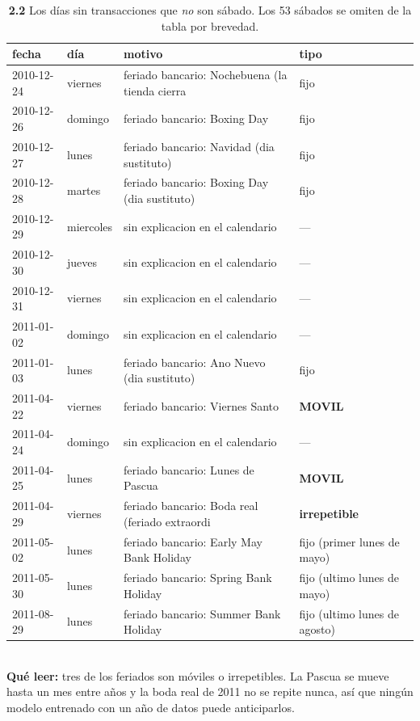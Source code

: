 \begin{table}[htbp]
\centering
\footnotesize
\caption{\textbf{2.2} Los d\'ias sin transacciones que \emph{no} son s\'abado. Los 53 s\'abados se omiten de la tabla por brevedad.}
\label{tab:p2_feriados}
\begin{tabular}{llll}
\toprule
\textbf{fecha} & \textbf{d\'ia} & \textbf{motivo} & \textbf{tipo} \\
\midrule
2010-12-24 & viernes & feriado bancario: Nochebuena (la tienda cierra & fijo \\
2010-12-26 & domingo & feriado bancario: Boxing Day & fijo \\
2010-12-27 & lunes & feriado bancario: Navidad (dia sustituto) & fijo \\
2010-12-28 & martes & feriado bancario: Boxing Day (dia sustituto) & fijo \\
2010-12-29 & miercoles & sin explicacion en el calendario & --- \\
2010-12-30 & jueves & sin explicacion en el calendario & --- \\
2010-12-31 & viernes & sin explicacion en el calendario & --- \\
2011-01-02 & domingo & sin explicacion en el calendario & --- \\
2011-01-03 & lunes & feriado bancario: Ano Nuevo (dia sustituto) & fijo \\
2011-04-22 & viernes & feriado bancario: Viernes Santo & \textbf{MOVIL} \\
2011-04-24 & domingo & sin explicacion en el calendario & --- \\
2011-04-25 & lunes & feriado bancario: Lunes de Pascua & \textbf{MOVIL} \\
2011-04-29 & viernes & feriado bancario: Boda real (feriado extraordi & \textbf{irrepetible} \\
2011-05-02 & lunes & feriado bancario: Early May Bank Holiday & fijo (primer lunes de mayo) \\
2011-05-30 & lunes & feriado bancario: Spring Bank Holiday & fijo (ultimo lunes de mayo) \\
2011-08-29 & lunes & feriado bancario: Summer Bank Holiday & fijo (ultimo lunes de agosto) \\
\bottomrule
\end{tabular}
\\[0.3em]{\scriptsize \textbf{Qu\'e leer:} tres de los feriados son m\'oviles o irrepetibles. La Pascua se mueve hasta un mes entre a\~nos y la boda real de 2011 no se repite nunca, as\'i que ning\'un modelo entrenado con un a\~no de datos puede anticiparlos.}
\end{table}
